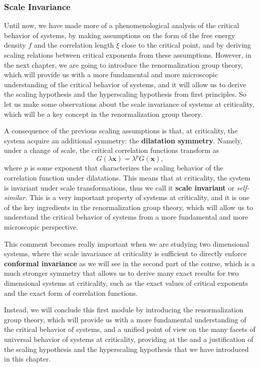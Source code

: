 \subsubsection{Scale Invariance}

Until now, we have made more of a phenomenological analysis of the critical behavior of systems, by making assumptions on the form of the free energy density \(f\) and the correlation length \(\xi\) close to the critical point, and by deriving scaling relations between critical exponents from these assumptions. However, in the next chapter, we are going to introduce the renormalization group theory, which will provide us with a more fundamental and more microscopic understanding of the critical behavior of systems, and it will allow us to derive the scaling hypothesis and the hyperscaling hypothesis from first principles. So let us make some observations about the scale invariance of systems at criticality, which will be a key concept in the renormalization group theory.

A consequence of the previous scaling assumptions is that, at criticality, the system acquire an additional symmetry: the \textbf{dilatation symmetry}. Namely, under a change of scale, the critical correlation functions transform as
\[
    G(\lambda \mathbf{x}) = \lambda^{p} G(\mathbf{x}),
\]
where \(p\) is some exponent that characterizes the scaling behavior of the correlation function under dilatations. This means that at criticality, the system is invariant under scale transformations, thus we call it \textbf{scale invariant} or \textit{self-similar}. This is a very important property of systems at criticality, and it is one of the key ingredients in the renormalization group theory, which will allow us to understand the critical behavior of systems from a more fundamental and more microscopic perspective.

This comment becomes really important when we are studying two dimensional systems, where the scale invariance at criticality is sufficient to directly enforce \textbf{conformal invariance} as we will see in the second part of the course, which is a much stronger symmetry that allows us to derive many exact results for two dimensional systems at criticality, such as the exact values of critical exponents and the exact form of correlation functions.

Instead, we will conclude this first module by introducing the renormalization group theory, which will provide us with a more fundamental understanding of the critical behavior of systems, and a unified point of view on the many facets of universal behavior of systems at criticality, providing at the and a justification of the scaling hypothesis and the hyperscaling hypothesis that we have introduced in this chapter.